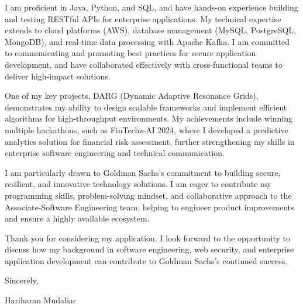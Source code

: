 \documentclass[letterpaper,11pt]{article}
\begin{document}
I am proficient in Java, Python, and SQL, and have hands-on experience building and testing RESTful APIs for enterprise applications. My technical expertise extends to cloud platforms (AWS), database management (MySQL, PostgreSQL, MongoDB), and real-time data processing with Apache Kafka. I am committed to communicating and promoting best practices for secure application development, and have collaborated effectively with cross-functional teams to deliver high-impact solutions.

One of my key projects, DARG (Dynamic Adaptive Resonance Grids), demonstrates my ability to design scalable frameworks and implement efficient algorithms for high-throughput environments. My achievements include winning multiple hackathons, such as FinTechz-AI 2024, where I developed a predictive analytics solution for financial risk assessment, further strengthening my skills in enterprise software engineering and technical communication.

I am particularly drawn to Goldman Sachs’s commitment to building secure, resilient, and innovative technology solutions. I am eager to contribute my programming skills, problem-solving mindset, and collaborative approach to the Associate-Software Engineering team, helping to engineer product improvements and ensure a highly available ecosystem.

Thank you for considering my application. I look forward to the opportunity to discuss how my background in software engineering, web security, and enterprise application development can contribute to Goldman Sachs’s continued success.

\vspace{10pt}

\noindent Sincerely,

\vspace{20pt}

\noindent Hariharan Mudaliar
\end{document}
